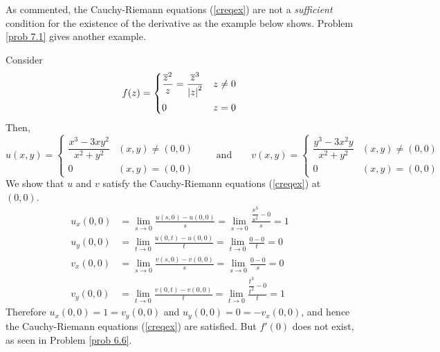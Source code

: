 \vspace*{1em}

As commented, the Cauchy-Riemann equations (\ref{creqex}) are not a \emph{sufficient} condition for the existence of the derivative as the example below shows. Problem \ref{prob 7.1} gives another example.
\begin{example}\label{onlynecescr}
Consider
\[f(z) = \begin{cases}\dfrac{\overline{z}^2}{z} = \dfrac{\overline{z}^3}{\left\lvert z\right\rvert^2} & z \neq 0\\[1em] 0 & z = 0 \end{cases}\]
Then,
\[u(x,y) = \begin{cases}\dfrac{x^3 - 3xy^2}{x^2 + y^2} & (x,y) \neq (0,0)\\[1em] 0 & (x,y) = (0,0) \end{cases} \qquad \text{and} \qquad v(x,y) = \begin{cases}\dfrac{y^3 - 3x^2y}{x^2 + y^2} & (x,y) \neq (0,0)\\[1em] 0 & (x,y) = (0,0) \end{cases}\]
We show that $u$ and $v$ satisfy the Cauchy-Riemann equations (\ref{creqex}) at $(0,0)$.
\begin{align*}
u_x(0,0) &= \lim_{s \to 0}\frac{u(s,0) - u(0,0)}{s} = \lim_{s \to 0}\frac{\dfrac{s^3}{s^2} - 0}{s} = 1\\[0.5em]
u_y(0,0) &= \lim_{t \to 0}\frac{u(0,t) - u(0,0)}{t} = \lim_{t \to 0}\frac{0 - 0}{t} = 0  \\[1em]
v_x(0,0) &= \lim_{s \to 0}\frac{v(s,0) - v(0,0)}{s} = \lim_{s \to 0}\frac{0 - 0}{s} = 0\\[0.5em]
v_y(0,0) &= \lim_{t \to 0}\frac{v(0,t) - v(0,0)}{t} = \lim_{t \to 0}\frac{\dfrac{t^3}{t^2} - 0}{t} = 1
\end{align*}
Therefore $u_x(0,0) = 1 = v_y(0,0)$ and $u_y(0,0) = 0 = -v_x(0,0)$, and hence the Cauchy-Riemann equations (\ref{creqex}) are satisfied. But $f'(0)$ does not exist, as seen in Problem \ref{prob 6.6}.
\end{example}

\vspace*{1em}

